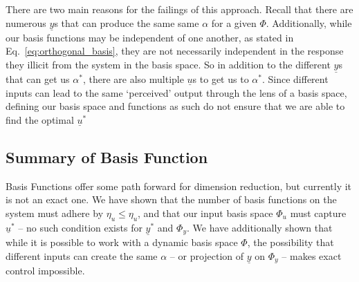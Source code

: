 There are two main reasons for the failings of this approach. Recall that there are numerous $\underline{y}$s that can produce the same same $\alpha$ for a given $\Phi$. Additionally, while our basis functions may be independent of one another, as stated in Eq.~\ref{eq:orthogonal_basis}, they are not necessarily independent in the response they illicit from the system in the basis space. So in addition to the different $\underline{y}$s that can get us $\alpha^\ast$, there are also multiple $\underline{u}$s to get us to $\alpha^\ast$. Since different inputs can lead to the same `perceived' output through the lens of a basis space, defining our basis space and functions as such do not ensure that we are able to find the optimal $\underline{u}^\ast$

\FloatBarrier\subsection{Summary of Basis Function}
Basis Functions offer some path forward for dimension reduction, but currently it is not an exact one. We have shown that the number of basis functions on the system must adhere by $\eta_u \leq \eta_u$, and that our input basis space $\Phi_u$ must capture $\underline{u}^\ast$ -- no such condition exists for $\underline{y}^\ast$ and $\Phi_y$. We have additionally shown that while it is possible to work with a dynamic basis space $\Phi$, the possibility that different inputs can create the same $\alpha$ -- or projection of $\underline{y}$ on $\Phi_y$ -- makes exact control impossible.